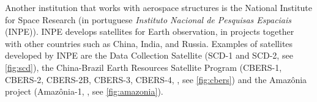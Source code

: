\begin{figure}[H]
\begin{center}
{\begin{minipage}{0.9\textwidth}
\end{minipage}}%
\end{center}
\vspace{1.5em}
\end{figure}

Another institution that works with aerospace structures is the National Institute for Space Research (in portuguese \textit{Instituto Nacional de Pesquisas Espaciais} (INPE)). INPE develops satellites for Earth observation, in projects together with other countries such as China, India, and Russia. Examples of satellites developed by INPE are the Data Collection Satellite (SCD-1 \cite{SCD1} and SCD-2, see \autoref{fig:scd}), the China-Brazil Earth Resources Satellite Program (CBERS-1, CBERS-2, CBERS-2B, CBERS-3, CBERS-4, \cite{CBERS}, see \autoref{fig:cbers}) and the Amaz\^onia project (Amaz\^onia-1, \cite{AMAZONIA}, see \autoref{fig:amazonia}).

